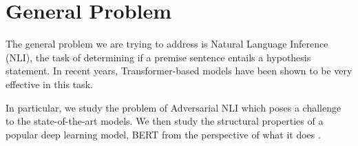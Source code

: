 \section{General Problem}
\label{sec:general problem}

The general problem we are trying to address is Natural Language Inference (NLI), the task of determining if a premise sentence entails a hypothesis statement. In recent years, Transformer-based models have been shown to be very effective in this task.

In particular, we study the problem of Adversarial NLI \cite{nie2019adversarial} which poses a challenge to the state-of-the-art models. We then study the structural properties of a popular deep learning model, BERT \cite{devlin-etal-2019-bert} from the perspective of what it does \cite{michel2019sixteen, rogers2020primer, clark2019does}.
 